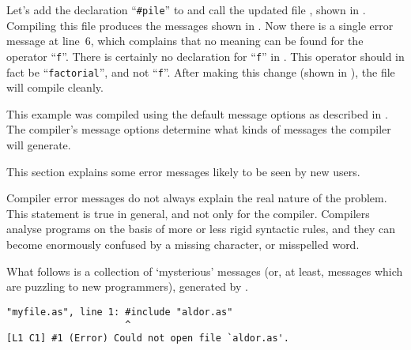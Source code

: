 
Let's add the declaration ``\verb+#pile+'' to  and call
the updated file , shown in
.  Compiling this file produces the messages
shown in .
Now there is a single error message at line~6, which complains that
no meaning can be found for the operator ``\verb+f+''.  There is certainly
no declaration for ``\verb+f+'' in .  This operator
should in fact be ``\verb+factorial+'', and not ``\verb+f+''.
After making this change (shown in ),
the file will compile cleanly.

This example was compiled using the default message options as described
in .  The compiler's message options
determine what kinds of messages the compiler will generate.


\newcommand{\Situation}[1]{{\bf \underline \sf {#1}}}

This section explains some error messages likely to be seen by new users.

Compiler error messages do not always explain the real nature of
the problem. This statement is true in general, and not only for the
\asharp{} compiler. Compilers analyse programs on the basis of more or
less rigid syntactic rules, and they can become enormously confused by
a missing character, or misspelled word.

What follows is a collection of `mysterious' messages (or, at least,
messages which are puzzling to new \asharp{} programmers), generated by
\asharp{}.


{\small
\begin{verbatim}
"myfile.as", line 1: #include "aldor.as"
                     ^
[L1 C1] #1 (Error) Could not open file `aldor.as'.
\end{verbatim}
}

